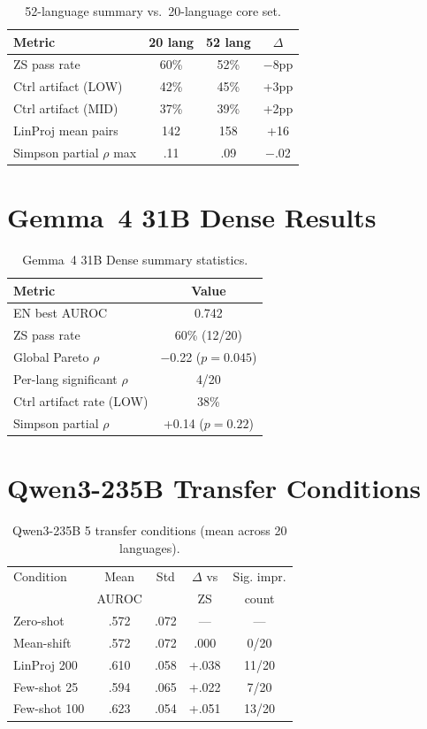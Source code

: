 \documentclass[11pt,a4paper]{article}
\newcommand{\auroc}{AUROC}
\begin{document}
\begin{table}[h]
\centering
\small
\caption{52-language summary vs.\ 20-language core set.}
\label{tab:extended_lang}
\begin{tabular}{lccc}
\toprule
Metric & 20 lang & 52 lang & $\Delta$ \\
\midrule
ZS pass rate & 60\% & 52\% & $-$8pp \\
Ctrl artifact (LOW) & 42\% & 45\% & +3pp \\
Ctrl artifact (MID) & 37\% & 39\% & +2pp \\
LinProj mean pairs & 142 & 158 & +16 \\
Simpson partial $\rho$ max & .11 & .09 & $-$.02 \\
\bottomrule
\end{tabular}
\end{table}

\section{Gemma~4 31B Dense Results}
\label{app:gemma}

\begin{table}[h]
\centering
\small
\caption{Gemma~4 31B Dense summary statistics.}
\label{tab:gemma}
\begin{tabular}{lc}
\toprule
Metric & Value \\
\midrule
EN best \auroc{} & 0.742 \\
ZS pass rate & 60\% (12/20) \\
Global Pareto $\rho$ & $-$0.22 ($p = 0.045$) \\
Per-lang significant $\rho$ & 4/20 \\
Ctrl artifact rate (LOW) & 38\% \\
Simpson partial $\rho$ & +0.14 ($p = 0.22$) \\
\bottomrule
\end{tabular}
\end{table}

\section{Qwen3-235B Transfer Conditions}
\label{app:qwen_transfer}

\begin{table}[h]
\centering
\small
\caption{Qwen3-235B 5 transfer conditions (mean across 20 languages).}
\label{tab:qwen_transfer}
\begin{tabular}{lcccc}
\toprule
Condition & Mean & Std & $\Delta$ vs & Sig. impr. \\
          & \auroc{} &     & ZS & count \\
\midrule
Zero-shot & .572 & .072 & --- & --- \\
Mean-shift & .572 & .072 & .000 & 0/20 \\
LinProj 200 & .610 & .058 & +.038 & 11/20 \\
Few-shot 25 & .594 & .065 & +.022 & 7/20 \\
Few-shot 100 & .623 & .054 & +.051 & 13/20 \\
\bottomrule
\end{tabular}
\end{table}
\end{document}
